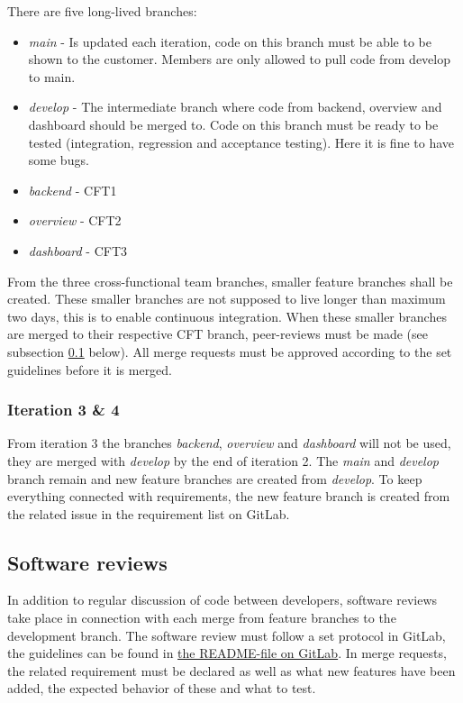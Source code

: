 \noindent There are five long-lived branches:
\begin{itemize}
\item \emph{main} - Is updated each iteration, code on this branch must be able to be shown to the customer. Members are only allowed to pull code from develop to main.
\item \emph{develop} - The intermediate branch where code from backend, overview and dashboard should be merged to. Code on this branch must be ready to be tested (integration, regression and acceptance testing). Here it is fine to have some bugs.
\item \emph{backend} - CFT1
\item \emph{overview} - CFT2
\item \emph{dashboard} - CFT3
\end{itemize}

\noindent From the three cross-functional team branches, smaller feature branches shall be created. These smaller branches are not supposed to live longer than maximum two days, this is to enable continuous integration. When these smaller branches are merged to their respective CFT branch, peer-reviews must be made (see subsection \ref{subsec:reviews} below). 
All merge requests must be approved according to the set guidelines before it is merged.

\subsubsection*{Iteration 3 \& 4}
From iteration 3 the branches \emph{backend}, \emph{overview} and \emph{dashboard} will not be used, they are merged with \emph{develop} by the end of iteration 2. The \emph{main} and \emph{develop} branch remain and new feature branches are created from \emph{develop}. To keep everything connected with requirements, the new feature branch is created from the related issue in the requirement list on GitLab.

\subsection{Software reviews}
\label{subsec:reviews}
In addition to regular discussion of code between developers, software reviews take place in connection with each merge from feature branches to the development branch. The software review must follow a set protocol in GitLab, the guidelines can be found in \href{https://gitlab.liu.se/tddc88-company-1-2021/deploy/-/blob/develop/README.md}{the README-file on GitLab}. In merge requests, the related requirement must be declared as well as what new features have been added, the expected behavior of these and what to test.

